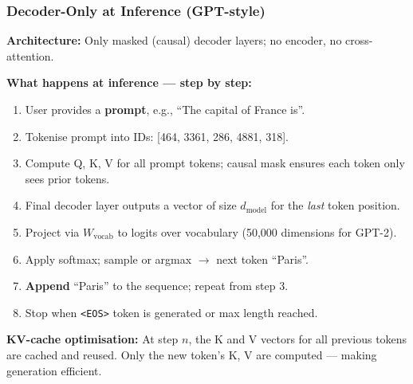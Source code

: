 \begin{frame}[fragile]\frametitle{Decoder-Only at Inference (GPT-style)}

\textbf{Architecture:} Only masked (causal) decoder layers; no encoder, no cross-attention.

\textbf{What happens at inference --- step by step:}
\begin{enumerate}
\item User provides a \textbf{prompt}, e.g., ``The capital of France is''.
\item Tokenise prompt into IDs: [464, 3361, 286, 4881, 318].
\item Compute Q, K, V for all prompt tokens; causal mask ensures each token only sees prior tokens.
\item Final decoder layer outputs a vector of size $d_{\text{model}}$ for the \emph{last} token position.
\item Project via $W_{\text{vocab}}$ to logits over vocabulary (50,000 dimensions for GPT-2).
\item Apply softmax; sample or argmax $\to$ next token ``Paris''.
\item \textbf{Append} ``Paris'' to the sequence; repeat from step 3.
\item Stop when \texttt{<EOS>} token is generated or max length reached.
\end{enumerate}

\textbf{KV-cache optimisation:} At step $n$, the K and V vectors for all previous tokens are cached and reused. Only the new token's K, V are computed --- making generation efficient.

\end{frame}

